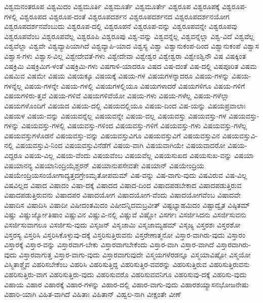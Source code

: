 {ವಿಶ್ವಮನಂತರೂಪ
ವಿಶ್ವಮಿದಂ
ವಿಶ್ವಮೂರ್ತಿ
ವಿಶ್ವಮೂರ್ತೆ
ವಿಶ್ವಮೂರ್ತೇ
ವಿಶ್ವರೂಪ
ವಿಶ್ವರೂಪಕ್ಕೆ
ವಿಶ್ವರೂಪ-ಗಳಲ್ಲಿ
ವಿಶ್ವರೂಪದ
ವಿಶ್ವರೂಪ-ದಂತೆ
ವಿಶ್ವರೂಪದರ್ಶನ
ವಿಶ್ವರೂಪದರ್ಶನದ
ವಿಶ್ವರೂಪದರ್ಶನಯೋಗ
ವಿಶ್ವರೂಪದರ್ಶನವೆಂಬುದು
ವಿಶ್ವರೂಪ-ದಲ್ಲಿ
ವಿಶ್ವರೂಪನೆ
ವಿಶ್ವರೂಪ-ವನ್ನು
ವಿಶ್ವರೂಪವನ್ನೇ
ವಿಶ್ವರೂಪವು
ವಿಶ್ವರೂಪವೆಂಬ
ವಿಶ್ವರೂಪವೆಲ್ಲ
ವಿಶ್ವರೂಪಿ
ವಿಶ್ವರೂಪು
ವಿಶ್ವ-ವನ್ನು
ವಿಶ್ವವನ್ನೆಲ್ಲ
ವಿಶ್ವವನ್ನೆಲ್ಲಾ
ವಿಶ್ವ-ವಿದೆ
ವಿಶ್ವವೆಲ್ಲ
ವಿಶ್ವವೆಲ್ಲಾ
ವಿಶ್ವವೇ
ವಿಶ್ವವ್ಯಾಪಿಯಾಗಿದೆ
ವಿಶ್ವವ್ಯಾಪಿ-ಯಾದ
ವಿಶ್ವಸ್ಯ
ವಿಶ್ವಾ
ವಿಶ್ವಾನುಕಂಪ-ದಿಂದ
ವಿಶ್ವಾನುಕಂಪೆ
ವಿಶ್ವಾಸ
ವಿಶ್ವಾಸ-ಗಳು
ವಿಶ್ವಾಸ-ವಿಲ್ಲ
ವಿಶ್ವೇದೇವತೆ-ಗಳು
ವಿಶ್ವೇದೇವಾ
ವಿಶ್ವೇಶ್ವರ
ವಿಶ್ವೇಶ್ವರಾ
ವಿಶ್ವೇಽಶ್ವಿನೌ
ವಿಷ
ವಿಷಕ್ಕಿಂತ
ವಿಷಕ್ರಿಮಿ
ವಿಷಕ್ರಿಮಿಗ-ಳಂತೆ
ವಿಷಕ್ರಿಮಿ-ಗಳು
ವಿಷಗಾಳಿ-ಯಾದರೂ
ವಿಷದ
ವಿಷ-ದಂತೆ
ವಿಷ-ದಲ್ಲಿ
ವಿಷಪೂರಿತ
ವಿಷಮ
ವಿಷಮಿವ
ವಿಷಮೇ
ವಿಷಯ
ವಿಷಯಕ್ಕೂ
ವಿಷಯಕ್ಕೆ
ವಿಷಯ-ಗಳ
ವಿಷಯಗಳನ್ನಾದರೂ
ವಿಷಯ-ಗಳನ್ನು
ವಿಷಯ-ಗಳನ್ನೆಲ್ಲ
ವಿಷಯ-ಗಳನ್ನೇ
ವಿಷಯ-ಗಳಲ್ಲಿ
ವಿಷಯಗಳಲ್ಲಿಯೂ
ವಿಷಯಗಳಾದರೆ
ವಿಷಯಗಳಿಗೂ
ವಿಷಯ-ಗಳಿಗೆ
ವಿಷಯಗಳಿರು-ತ್ತವೆ
ವಿಷಯ-ಗಳಿವೆ
ವಿಷಯಗಳಿವೆಯೋ
ವಿಷಯ-ಗಳು
ವಿಷಯ-ಗಳೆಲ್ಲ
ವಿಷಯ-ಗಳೆಲ್ಲಾ
ವಿಷಯಗಳೊಂದಿಗೆ
ವಿಷಯದ
ವಿಷಯ-ದಲ್ಲಿ
ವಿಷಯದಲ್ಲಿಯೂ
ವಿಷಯ-ದಿಂದ
ವಿಷ-ಯನ್ನು
ವಿಷಯಪ್ರವಾಲಾಃ
ವಿಷಯಳ
ವಿಷಯ-ವನ್ನು
ವಿಷಯವನ್ನೆಲ್ಲ
ವಿಷಯವನ್ನೇ
ವಿಷಯ-ವಲ್ಲ
ವಿಷಯವಸ್ತು
ವಿಷಯವಸ್ತು-ಗಳ
ವಿಷಯವಸ್ತು-ಗಳನ್ನು
ವಿಷಯವಸ್ತು-ಗಳಲ್ಲಿ
ವಿಷಯವಸ್ತು-ಗಳಿಂದ
ವಿಷಯವಸ್ತು-ಗಳಿಗೆ
ವಿಷಯವಸ್ತು-ಗಳು
ವಿಷಯವಸ್ತು-ಗಳೆಲ್ಲ
ವಿಷಯವಸ್ತುಗಳೊಡನೆ
ವಿಷಯವಸ್ತು-ವನ್ನು
ವಿಷಯವಸ್ತುವಿಗೂ
ವಿಷಯವಸ್ತುವಿಗೆ
ವಿಷಯವಸ್ತುವಿನ
ವಿಷಯವಸ್ತುವಿ-ನಲ್ಲಿ
ವಿಷಯವಸ್ತುವಿ-ನಿಂದ
ವಿಷಯವಸ್ತುವಿನೆಡೆಗೆ
ವಿಷಯ-ವಾಗಿ
ವಿಷಯವಾಗಿಯೇ
ವಿಷಯವಾದರೋ
ವಿಷಯ-ವಿದ್ದರೂ
ವಿಷಯ-ವಿಲ್ಲ
ವಿಷಯ-ವೆಂದು
ವಿಷಯವೆಂಬ
ವಿಷಯವೆಲ್ಲ
ವಿಷಯಸುಖದ
ವಿಷಯಸುಖ-ವನ್ನು
ವಿಷಯಾ
ವಿಷಯಾನನ್ಯ
ವಿಷಯಾನಿಂದ್ರಿಯೈಶ್ಚರನ್
ವಿಷಯಾನುಪಸೇವತೇ
ವಿಷಯಾನ್
ವಿಷಯೇಂದ್ರಿಯ
ವಿಷಯೇಂದ್ರಿಯಸಂಯೋಗಾದ್ಯತ್ತದಗ್ರೇಽಮೃತೋಪಮಮ್
ವಿಷ-ವನ್ನು
ವಿಷ-ವಾಗು-ವುದು
ವಿಷವಿರುವ
ವಿಷ-ವಿಲ್ಲ
ವಿಷವಿಲ್ಲದ
ವಿಷಾದ
ವಿಷಾದಂ
ವಿಷಾ-ದಕ್ಕೆ
ವಿಷಾದದ
ವಿಷಾದ-ದಿಂದ
ವಿಷಾದಪಡಬೇಕಾದ
ವಿಷಾದಪಡುತ್ತಿರುವ
ವಿಷಾದಪಡುತ್ತಿರುವನು
ವಿಷಾದಪರ
ವಿಷಾದಯೋಗ
ವಿಷಾದಯೋಗ-ವೆಂದು
ವಿಷಾದಯೋಗವೆಂಬ
ವಿಷಾದವೇ
ವಿಷಾದಿಸ
ವಿಷಾದಿಸಿ
ವಿಷಾದೀ
ವಿಷೀದಂತಮಿದಂ
ವಿಷೀದನ್ನಿದಮಬ್ರವೀತ್
ವಿಷ್ಟಭ್ಯಾಹಮಿದಂ
ವಿಷ್ಟಾದ್ವೈತ
ವಿಷ್ಠಿತಮ್
ವಿಷ್ಣು
ವಿಷ್ಣುರ್ಜ್ಯೋತಿಷಾಂ
ವಿಷ್ಣುವಿನ
ವಿಷ್ಣುವಿ-ನಲ್ಲಿ
ವಿಷ್ಣುವೆ
ವಿಷ್ಣೋ
ವಿಸರ್ಗಃ
ವಿಸರ್ಜಿಸಿದನು
ವಿಸರ್ಜಿಸುವನು
ವಿಸರ್ಜಿಸುವಾಗಲೂ
ವಿಸರ್ಜಿಸು-ವುದು
ವಿಸೃಜನ್
ವಿಸೃಜಾಮಿ
ವಿಸೃಜಾಮ್ಯಹಮ್
ವಿಸೃಜ್ಯ
ವಿಸ್ತರಶಃ
ವಿಸ್ತರಶೋ
ವಿಸ್ತರಸ್ಯ
ವಿಸ್ತರಿಸಿ
ವಿಸ್ತರಿಸಿಕೊಳ್ಳುವು-ದಕ್ಕೆ
ವಿಸ್ತರಿಸುತ್ತಿರುವನು
ವಿಸ್ತರೇಣಾತ್ಮನೋ
ವಿಸ್ತಾರ-ವಾಗಿರು-ವುದು
ವಿಸ್ತಾರಂ
ವಿಸ್ತಾರಕ್ಕೆ
ವಿಸ್ತಾರ-ವನ್ನು
ವಿಸ್ತಾರವಾಗ-ಬೇಕು
ವಿಸ್ತಾರವಾಗಬೇಕೆಂದು
ವಿಸ್ತಾರ-ವಾಗಿ
ವಿಸ್ತಾರ-ವಾಗಿದೆ
ವಿಸ್ತಾರವಾಗಿರು-ವುದು
ವಿಸ್ತಾರವಾಗುತ್ತ
ವಿಸ್ತಾರ-ವಾಗು-ವುದು
ವಿಸ್ತಾರವಾಗುವುದೇ
ವಿಸ್ಮಯಗಳೆರಡನ್ನೂ
ವಿಸ್ಮಯಾವಿಷ್ಟೋ
ವಿಸ್ಮಯೋ
ವಿಸ್ಮಿತಾಶ್ಚೈವ
ವಿಹರಿಸಬೇಕೆಂಬ
ವಿಹರಿಸಿ
ವಿಹರಿಸುತ್ತಿದ್ದ
ವಿಹರಿಸುತ್ತಿರ-ವವರನ್ನು
ವಿಹರಿಸುತ್ತಿರುವ
ವಿಹರಿಸುತ್ತಿರುವನು
ವಿಹರಿಸುತ್ತಿರು-ವಾಗ
ವಿಹರಿಸುತ್ತಿರು-ವುದು
ವಿಹರಿಸುವರೊ
ವಿಹರಿಸುವವನಿಗೂ
ವಿಹರಿಸುವು-ದಕ್ಕೆ
ವಿಹರಿಸು-ವುದು
ವಿಹಾಯ
ವಿಹಾರ
ವಿಹಾರಕ್ಕೆ
ವಿಹಾರ-ಗಳನ್ನು
ವಿಹಾರ-ದಲ್ಲಿ
ವಿಹಾರ-ವಾಗು-ವುದು
ವಿಹಾರಶಯ್ಯಾಸನಭೋಜನೇಷು
ವಿಹಾರಿ-ಯಾಗಿ
ವಿಹಿತ-ವಾಗಿದೆ
ವಿಹಿತಾಃ
ವಿಹಿತಾನ್
ವಿಹ್ವಲ-ನಾಗಿ
ವೀಕ್ಷಂತೇ
ವೀಣೆ
}
